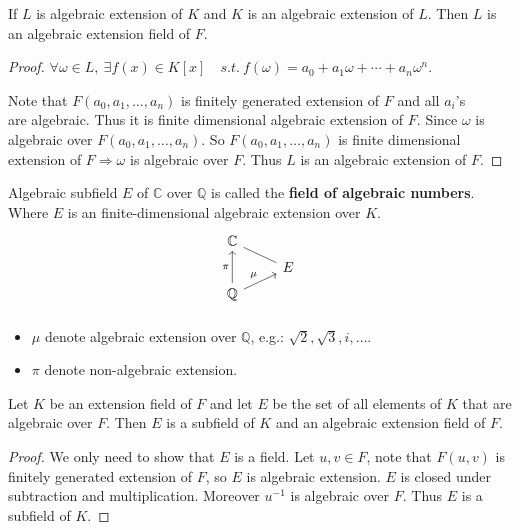 \begin{corollary}
    If $L$ is algebraic extension of $K$ and $K$ is an algebraic extension of $L$. Then 
    $L$ is an algebraic extension field of $F$.
\end{corollary}
\begin{proof}
    $\forall \omega \in L, \> \exists f(x) \in K[x] \quad s.t. \> f(\omega) = a_0 + a_1 \omega 
    + \cdots + a_n \omega^n$. 

    Note that $F(a_0, a_1, \ldots, a_n)$ is finitely generated extension of $F$ and all $a_i$'s
    \\are algebraic. Thus it is finite dimensional algebraic extension of $F$. Since 
    $\omega$ is algebraic over $F(a_0, a_1, \ldots, a_n)$. So $F(a_0, a_1, \ldots, a_n)$ is finite 
    dimensional extension of $F \Longrightarrow \omega$ is algebraic over $F$.
    Thus $L$ is an algebraic extension of $F$.
\end{proof}

\begin{remark}
    Algebraic subfield $E$ of $\mathbb{C}$ over $\mathbb{Q}$ is called the \textbf{field of algebraic numbers}. 
    Where $E$ is an finite-dimensional algebraic extension over $K$.
    \[
        \begin{tikzcd}[row sep=tiny]
            \mathbb{C} &\\
             & E  \arrow[dash]{ul}
            \\
            \mathbb{Q} \arrow[uu, "\pi"] \arrow[ur, "\mu"]&\\
        \end{tikzcd}
    \]

    \begin{itemize}
        \item $\mu$ denote algebraic extension over $\mathbb{Q}$, e.g.: $\sqrt{2}, \sqrt{3}, i, \ldots$.
        \item $\pi$ denote non-algebraic extension.
    \end{itemize}
\end{remark}

\begin{corollary}
    Let $K$ be an extension field of $F$ and let $E$ be the set of all elements of $K$ that are 
    algebraic over $F$. Then $E$ is a subfield of $K$ and an algebraic extension field of $F$.
\end{corollary}
\begin{proof}
    We only need to show that $E$ is a field. Let $u,v \in F$, note that $F(u,v)$ 
    is finitely generated extension of $F$, so $E$ is algebraic extension.
    $E$ is closed under subtraction and multiplication. Moreover $u^{-1}$ is 
    algebraic over $F$. Thus $E$ is a subfield of $K$.
\end{proof}


